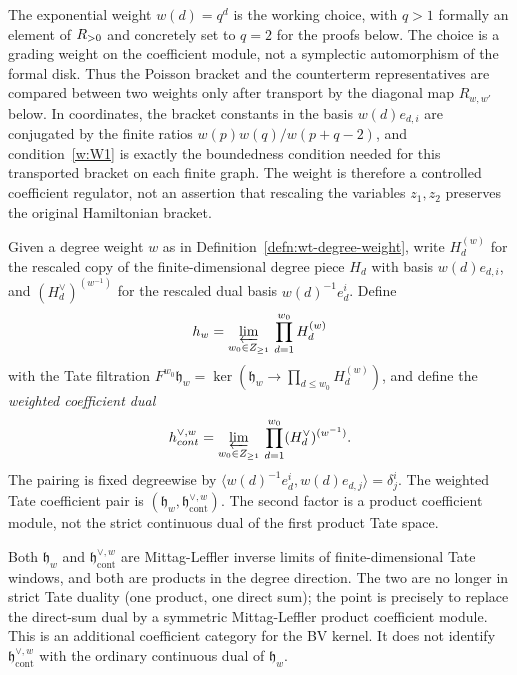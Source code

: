 \begin{rmk}\label{rmk:wt-canonical-weight}
  The exponential weight $w(d)=q^d$ is the working choice, with $q>1$
  formally an element of $R_{>0}$ and concretely set to $q=2$ for
  the proofs below. The choice is a grading weight on the coefficient
  module, not a symplectic automorphism of the formal disk.  Thus the
  Poisson bracket and the counterterm representatives are compared
  between two weights only after transport by the diagonal map
  \(R_{w,w'}\) below.  In coordinates, the bracket constants in the
  basis \(w(d)e_{d,i}\) are conjugated by the finite ratios
  \(w(p)w(q)/w(p+q-2)\), and condition~\ref{w:W1} is exactly the
  boundedness condition needed for this transported bracket on each
  finite graph.  The weight is therefore a controlled coefficient
  regulator, not an assertion that rescaling the variables
  \(z_1,z_2\) preserves the original Hamiltonian bracket.
\end{rmk}

\begin{defn}\label{defn:wt-coefficient-pair}
  Given a degree weight $w$ as in
  Definition~\ref{defn:wt-degree-weight}, write $H_d^{(w)}$ for the
  rescaled copy of the finite-dimensional degree piece
  $H_d$ with basis $w(d)e_{d,i}$, and
  $(H_d^\vee)^{(w^{-1})}$ for the rescaled dual basis
  $w(d)^{-1}e^i_d$.  Define
  \begin{equation}\label{eq:wt-h-defn}
    h_w=\varprojlim_{w_0\in Z_{\geq1}}\,
      \prod_{d=1}^{w_0}H_d^{(w)}
  \end{equation}
  with the Tate filtration $F^{w_0}\mathfrak h_w=\ker(\mathfrak h_w\to
  \prod_{d\leq w_0}H_d^{(w)})$, and define the \emph{weighted
  coefficient dual}
  \begin{equation}\label{eq:wt-hvee-defn}
    h^{\vee,w}_{cont}=
      \varprojlim_{w_0\in Z_{\geq1}}\,
      \prod_{d=1}^{w_0}(H_d^\vee)^{(w^{-1})}.
  \end{equation}
  The pairing is fixed degreewise by
  $\langle w(d)^{-1}e^i_d,w(d)e_{d,j}\rangle=\delta^i_j$.
  The weighted Tate coefficient pair is
  $(\mathfrak h_w,\mathfrak h^{\vee,w}_{\mathrm{cont}})$.  The second
  factor is a product coefficient module, not the strict continuous
  dual of the first product Tate space.
\end{defn}

\begin{rmk}\label{rmk:wt-topology-content}
  Both $\mathfrak h_w$ and $\mathfrak h^{\vee,w}_{\mathrm{cont}}$ are
  Mittag-Leffler inverse limits of finite-dimensional Tate windows,
  and both are products in the degree direction. The two are no
  longer in strict Tate duality (one product, one direct sum); the
  point is precisely to replace the direct-sum dual by a symmetric
  Mittag-Leffler product coefficient module.  This is an additional
  coefficient category for the BV kernel.  It does not identify
  $\mathfrak h^{\vee,w}_{\mathrm{cont}}$ with the ordinary continuous
  dual of $\mathfrak h_w$.
\end{rmk}

